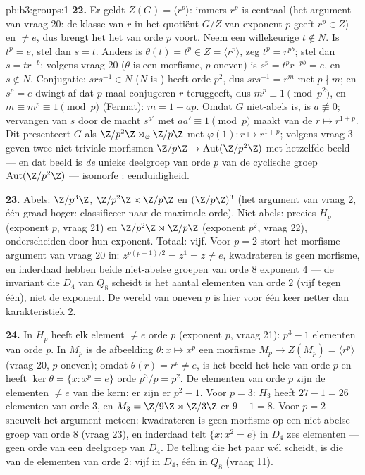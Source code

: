 \begin{solution}{pb:b3:groups:1}
\textbf{22.} Er geldt $Z(G) = \langle r^p\rangle$: immers $r^p$ is
centraal (het argument van vraag 20: de klasse van $r$ in het
quotiënt $G/Z$ van exponent $p$ geeft $r^p \in Z$) en $\neq e$, dus
brengt het het  van orde $p$ voort. Neem een willekeurige $t
\notin N$. Is $t^p = e$, stel dan $s = t$. Anders is $\theta(t) =
t^p \in Z = \langle r^p\rangle$, zeg $t^p = r^{pb}$; stel dan $s =
tr^{-b}$: volgens vraag 20 ($\theta$ is een morfisme, $p$ oneven)
is $s^p = t^pr^{-pb} = e$, en $s \notin N$. Conjugatie: $srs^{-1}
\in N$ ($N$ is ) heeft orde $p^2$, dus $srs^{-1} = r^m$ met
$p \nmid m$; en $s^p = e$ dwingt af dat $p$ maal conjugeren $r$
teruggeeft, dus $m^p \equiv 1 \pmod {p^2}$, en $m \equiv m^p \equiv
1 \pmod p$ (Fermat): $m = 1 + ap$. Omdat $G$ niet-abels is, is $a
\not\equiv 0$; vervangen van $s$ door de macht $s^{a'}$ met $aa'
\equiv 1 \pmod p$ maakt van de  $r \mapsto r^{1+p}$. Dit
presenteert $G$ als $\Z/p^2\Z\rtimes_\varphi\Z/p\Z$ met
$\varphi(1)\colon r \mapsto r^{1+p}$; volgens vraag 3 geven twee
niet-triviale morfismen $\Z/p\Z \to \operatorname{Aut}(\Z/p^2\Z)$
met hetzelfde beeld --- en dat beeld is \emph{de} unieke deelgroep
van orde $p$ van de cyclische groep $\operatorname{Aut}(\Z/p^2\Z)$
--- isomorfe : eenduidigheid.

\textbf{23.} Abels: $\Z/p^3\Z$, $\Z/p^2\Z\times\Z/p\Z$ en
$(\Z/p\Z)^3$ (het argument van vraag 2, één graad hoger:
classificeer naar de maximale orde). Niet-abels: precies $H_p$
(exponent $p$, vraag 21) en $\Z/p^2\Z\rtimes\Z/p\Z$ (exponent
$p^2$, vraag 22), onderscheiden door hun exponent. Totaal: vijf.
Voor $p = 2$ stort het morfisme-argument van vraag 20 in:
$z^{p(p-1)/2} = z^{1} = z \neq e$, kwadrateren is geen morfisme, en
inderdaad hebben beide niet-abelse groepen van orde $8$ exponent
$4$ --- de invariant die $D_4$ van $Q_8$ scheidt is het aantal
elementen van orde $2$ (vijf tegen één), niet de exponent. De
wereld van oneven $p$ is hier voor één keer netter dan
karakteristiek $2$.

\textbf{24.} In $H_p$ heeft elk element $\neq e$ orde $p$ (exponent
$p$, vraag 21): $p^3 - 1$ elementen van orde $p$. In $M_p$ is de
afbeelding $\theta \colon x \mapsto x^p$ een morfisme $M_p \to
Z(M_p) = \langle r^p\rangle$ (vraag 20, $p$ oneven); omdat
$\theta(r) = r^p \neq e$, is het beeld het hele  van orde
$p$ en heeft $\ker\theta = \{x : x^p = e\}$ orde $p^3/p = p^2$. De
elementen van orde $p$ zijn de elementen $\neq e$ van die kern: er
zijn er $p^2 - 1$. Voor $p = 3$: $H_3$ heeft $27 - 1 = 26$
elementen van orde $3$, en $M_3 = \Z/9\Z \rtimes \Z/3\Z$ er $9 - 1
= 8$. Voor $p = 2$ sneuvelt het argument meteen: kwadrateren is
geen morfisme op een niet-abelse groep van orde $8$ (vraag 23), en
inderdaad telt $\{x : x^2 = e\}$ in $D_4$ zes elementen --- geen
orde van een deelgroep van $D_4$. De telling die het paar wél
scheidt, is die van de elementen van orde $2$: vijf in $D_4$, één
in $Q_8$ (vraag 11).


\end{solution}

